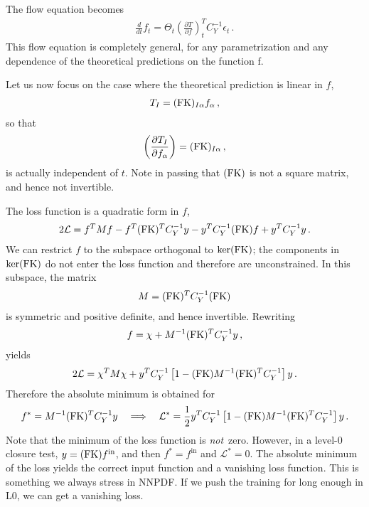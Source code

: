 \documentclass[11pt]{article}
\begin{document}
The flow equation becomes
\begin{align}
    \label{eq:FlowWithNTKNoIndices}
    \frac{d}{dt} f_t = 
        \Theta_t \left(\frac{\partial T}{\partial f}\right)_t^T C_Y^{-1} \epsilon_t\, .
\end{align}
This flow equation is completely general, for any parametrization and any dependence of the theoretical predictions on the function f.

Let us now focus on the case where the theoretical prediction is linear in $f$, 
\begin{align}
    \label{eq:LinearDataFK}
    T_I = (\mathrm{FK})_{I\alpha} f_\alpha\, ,
\end{align}
so that 
\begin{align}
    \label{eq:LinearNabla}
    \left(\frac{\partial T_I}{\partial f_\alpha}\right) = (\mathrm{FK})_{I\alpha}\, ,
\end{align}
is actually independent of $t$. Note in passing that $(\mathrm{FK})$ is not a square matrix, and hence not invertible. 

The loss function is a quadratic form in $f$,
\begin{align}
    \label{eq:QuadraticLossInf}
    2 \mathcal{L} = f^T M f - f^T (\mathrm{FK})^T C_Y^{-1} y - y^T C_Y^{-1} (\mathrm{FK}) f + y^T C_Y^{-1} y \, .
\end{align}
We can restrict $f$ to the subspace orthogonal to $\ker(\mathrm{FK})$; the components in $\ker(\mathrm{FK})$ do not 
enter the loss function and therefore are unconstrained. In this subspace, the matrix 
\begin{align}
    \label{eq:MmatrixForLoss}
    M = (\mathrm{FK})^T C_Y^{-1} (\mathrm{FK})
\end{align}
is symmetric and positive definite, and hence invertible. Rewriting 
\begin{align}
    \label{eq:CompleteTheSquare}
    f = \chi + M^{-1} (\mathrm{FK})^T C_Y^{-1} y\, ,
\end{align}
yields
\begin{align}
    \label{eq:LossFunctionOfChi}
    2 \mathcal{L} = \chi^T M \chi +
        y^T C_Y^{-1} \left[
            1 - (\mathrm{FK}) M^{-1} (\mathrm{FK})^T C_Y^{-1}
        \right] y\, .
\end{align}
Therefore the absolute minimum is obtained for 
\begin{align}
    \label{eq:MinimumLossInf}
    f^* = M^{-1} (\mathrm{FK})^T C_Y^{-1} y \quad \Longrightarrow \quad 
        \mathcal{L}^* = \frac12   y^T C_Y^{-1} \left[
            1 - (\mathrm{FK}) M^{-1} (\mathrm{FK})^T C_Y^{-1}
        \right] y\, .  
\end{align}
Note that the minimum of the loss function is {\em not}\ zero. However, in a level-0 closure test, $y = (\mathrm{FK}) f^{\mathrm{in}}$, and then 
$f^* = f^{\mathrm{in}}$ and $\mathcal{L}^*=0$. The absolute minimum of the loss yields the correct input function and a vanishing loss 
function. This is something we always stress in NNPDF. If we push the training for long enough in L0, we can get a vanishing loss. 
\end{document}
